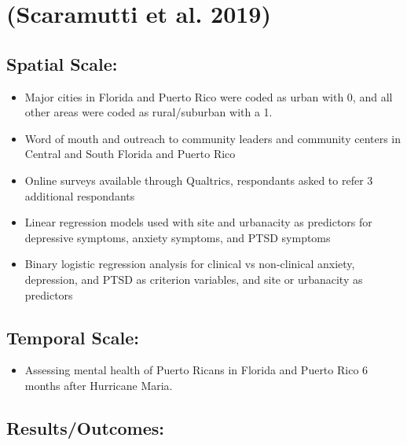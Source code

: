 \documentclass[
]{article}
\providecommand{\tightlist}{%
  \setlength{\itemsep}{0pt}\setlength{\parskip}{0pt}}
\begin{document}
\hypertarget{scaramutti2019mental}{%
\section{(Scaramutti et al. 2019)}\label{scaramutti2019mental}}

\hypertarget{spatial-scale-4}{%
\subsection{Spatial Scale:}\label{spatial-scale-4}}

\begin{itemize}
\tightlist
\item
  Major cities in Florida and Puerto Rico were coded as urban with 0,
  and all other areas were coded as rural/suburban with a 1.
\item
  Word of mouth and outreach to community leaders and community centers
  in Central and South Florida and Puerto Rico
\item
  Online surveys available through Qualtrics, respondants asked to refer
  3 additional respondants
\item
  Linear regression models used with site and urbanacity as predictors
  for depressive symptoms, anxiety symptoms, and PTSD symptoms
\item
  Binary logistic regression analysis for clinical vs non-clinical
  anxiety, depression, and PTSD as criterion variables, and site or
  urbanacity as predictors
\end{itemize}

\hypertarget{temporal-scale-2}{%
\subsection{Temporal Scale:}\label{temporal-scale-2}}

\begin{itemize}
\tightlist
\item
  Assessing mental health of Puerto Ricans in Florida and Puerto Rico 6
  months after Hurricane Maria.
\end{itemize}

\hypertarget{resultsoutcomes-4}{%
\subsection{Results/Outcomes:}\label{resultsoutcomes-4}}
\end{document}
